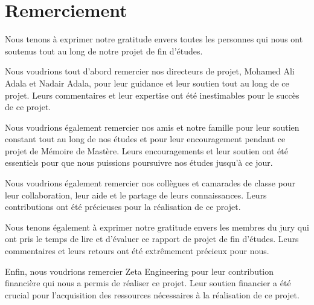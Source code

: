 \chapter*{Remerciement }

\setlength{\parskip}{5mm}
\setlength{\parindent}{1cm}


\large{
Nous tenons à exprimer notre gratitude envers toutes les personnes qui nous ont soutenus tout au long de notre projet de fin d'études.

Nous voudrions tout d'abord remercier nos directeurs de projet, Mohamed Ali Adala et Nadair Adala, pour leur guidance et leur soutien tout au long de ce projet. Leurs commentaires et leur expertise ont été inestimables pour le succès de ce projet.

Nous voudrions également remercier nos amis et notre famille pour leur soutien constant tout au long de nos études et pour leur encouragement pendant ce projet de Mémoire de Mastère. Leurs encouragements et leur soutien ont été essentiels pour que nous puissions poursuivre nos études jusqu'à ce jour.

Nous voudrions également remercier nos collègues et camarades de classe pour leur collaboration, leur aide et le partage de leurs connaissances. Leurs contributions ont été précieuses pour la réalisation de ce projet.

Nous tenons également à exprimer notre gratitude envers les membres du jury qui ont pris le temps de lire et d'évaluer ce rapport de projet de fin d'études. Leurs commentaires et leurs retours ont été extrêmement précieux pour nous.

Enfin, nous voudrions remercier Zeta Engineering pour leur contribution financière qui nous a permis de réaliser ce projet. Leur soutien financier a été crucial pour l'acquisition des ressources nécessaires à la réalisation de ce projet.}